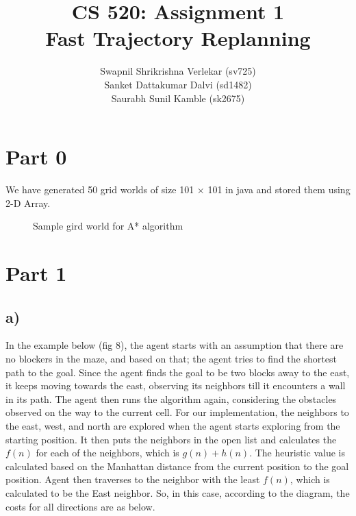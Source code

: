 \documentclass{article}
\title{CS 520: Assignment 1 \\
\large Fast Trajectory Replanning}
\author{Swapnil Shrikrishna Verlekar (sv725)\\ Sanket Dattakumar Dalvi (sd1482)\\ Saurabh Sunil Kamble (sk2675)}
\begin{document}
\maketitle

\section*{Part 0}

We have generated 50 grid worlds of size 101 × 101 in java and stored them using 2-D Array.

\begin{figure}[!ht]
    \centering
    \caption{Sample gird world for A* algorithm}
    \label{fig:my_label}
\end{figure}

\section*{Part 1}

\subsection*{a)}  
In the example below (fig 8), the agent starts with an assumption that there are no blockers in the maze, and based on that; the agent tries to find the shortest path to the goal. Since the agent finds the goal to be two blocks away to the east, it keeps moving towards the east, observing its neighbors till it encounters a wall in its path. The agent then runs the algorithm again, considering the obstacles observed on the way to the current cell. 
For our implementation, the neighbors to the east, west, and north are explored when the agent starts exploring from the starting position. It then puts the neighbors in the open list and calculates the $f(n)$ for each of the neighbors, which is $g(n) + h(n)$. The heuristic value is calculated based on the Manhattan distance from the current position to the goal position. 
Agent then traverses to the neighbor with the least $f(n)$, which is calculated to be the East neighbor.
So, in this case, according to the diagram, the costs for all directions are as below.
\end{document}
